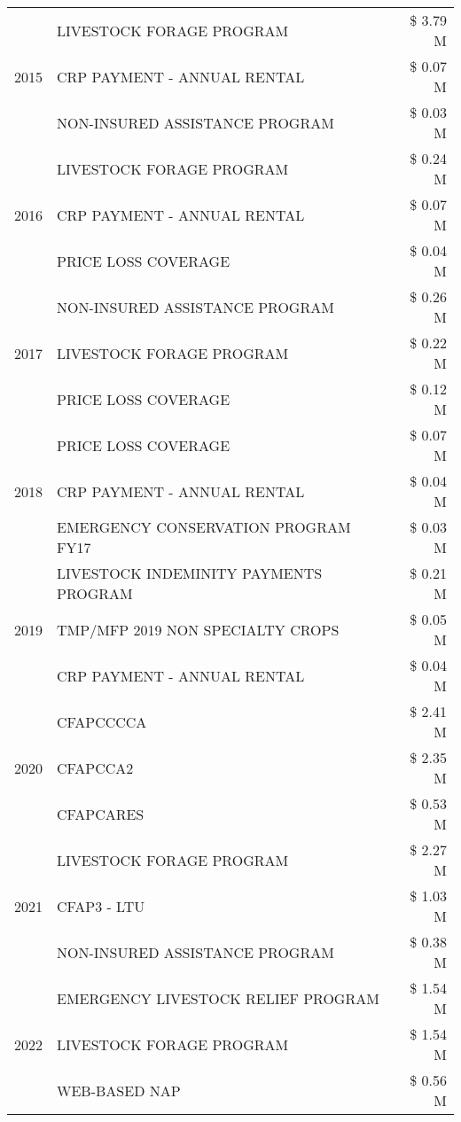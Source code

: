 \begin{tabular}{llr}
\cline{1-3}
\multirow[t]{3}{*}{2015} & LIVESTOCK FORAGE PROGRAM & \$ 3.79 M \\
 & CRP PAYMENT - ANNUAL RENTAL & \$ 0.07 M \\
 & NON-INSURED ASSISTANCE PROGRAM & \$ 0.03 M \\
\cline{1-3}
\multirow[t]{3}{*}{2016} & LIVESTOCK FORAGE PROGRAM & \$ 0.24 M \\
 & CRP PAYMENT - ANNUAL RENTAL & \$ 0.07 M \\
 & PRICE LOSS COVERAGE & \$ 0.04 M \\
\cline{1-3}
\multirow[t]{3}{*}{2017} & NON-INSURED ASSISTANCE PROGRAM & \$ 0.26 M \\
 & LIVESTOCK FORAGE PROGRAM & \$ 0.22 M \\
 & PRICE LOSS COVERAGE & \$ 0.12 M \\
\cline{1-3}
\multirow[t]{3}{*}{2018} & PRICE LOSS COVERAGE & \$ 0.07 M \\
 & CRP PAYMENT - ANNUAL RENTAL & \$ 0.04 M \\
 & EMERGENCY CONSERVATION PROGRAM FY17 & \$ 0.03 M \\
\cline{1-3}
\multirow[t]{3}{*}{2019} & LIVESTOCK INDEMINITY PAYMENTS PROGRAM & \$ 0.21 M \\
 & TMP/MFP 2019 NON SPECIALTY CROPS & \$ 0.05 M \\
 & CRP PAYMENT - ANNUAL RENTAL & \$ 0.04 M \\
\cline{1-3}
\multirow[t]{3}{*}{2020} & CFAPCCCCA & \$ 2.41 M \\
 & CFAPCCA2 & \$ 2.35 M \\
 & CFAPCARES & \$ 0.53 M \\
\cline{1-3}
\multirow[t]{3}{*}{2021} & LIVESTOCK FORAGE PROGRAM & \$ 2.27 M \\
 & CFAP3 - LTU & \$ 1.03 M \\
 & NON-INSURED ASSISTANCE PROGRAM & \$ 0.38 M \\
\cline{1-3}
\multirow[t]{3}{*}{2022} & EMERGENCY LIVESTOCK RELIEF PROGRAM & \$ 1.54 M \\
 & LIVESTOCK FORAGE PROGRAM & \$ 1.54 M \\
 & WEB-BASED NAP & \$ 0.56 M \\
\cline{1-3}
\bottomrule
\end{tabular}
